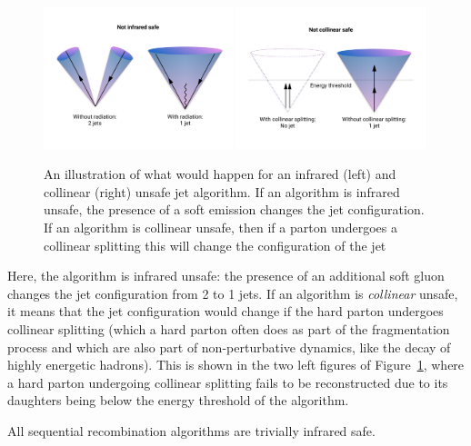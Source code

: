\begin{figure}[ht] 
    \centering
    \includegraphics[width=0.49\textwidth]{figures/event_reconstruction/IR_safety.pdf}
    \includegraphics[width=0.49\textwidth]{figures/event_reconstruction/Collinear_safety.pdf}
    \caption{An illustration of what would happen for an infrared (left) and collinear (right) unsafe jet algorithm. If an algorithm is infrared unsafe, the presence of a soft emission changes the jet configuration. If an algorithm is collinear unsafe, then if a parton undergoes a collinear splitting this will change the configuration of the jet}
    \label{fig:objreco:IRC}
\end{figure}

Here, the algorithm is infrared unsafe: the presence of an additional soft gluon changes the jet configuration from 2 to 1 jets. If an algorithm is \textit{collinear} unsafe, it means that the jet configuration would change if the hard parton undergoes collinear splitting (which a hard parton often does as part of the fragmentation process and which are also part of non-perturbative dynamics, like the decay of highly energetic hadrons). This is shown in the two left figures of Figure~\ref{fig:objreco:IRC}, where a hard parton undergoing collinear splitting fails to be reconstructed due to its daughters being below the energy threshold of the algorithm.


All sequential recombination algorithms are trivially infrared safe.
 
